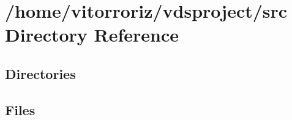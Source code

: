 \section{/home/vitorroriz/vdsproject/src Directory Reference}
\label{dir_68267d1309a1af8e8297ef4c3efbcdba}
\subsection*{Directories}
\begin{DoxyCompactItemize}
\end{DoxyCompactItemize}
\subsection*{Files}
\begin{DoxyCompactItemize}
\end{DoxyCompactItemize}
